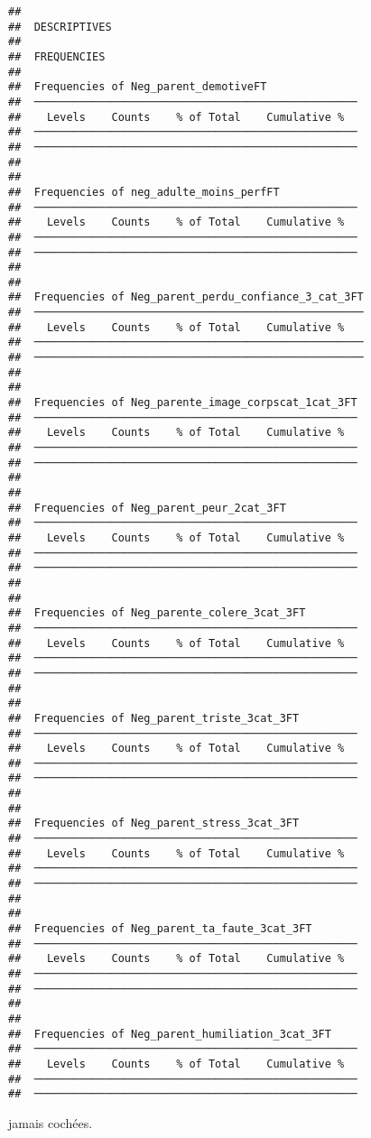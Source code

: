 \documentclass[
]{article}
\begin{document}
\begin{verbatim}
## 
##  DESCRIPTIVES
## 
##  FREQUENCIES
## 
##  Frequencies of Neg_parent_demotiveFT               
##  ────────────────────────────────────────────────── 
##    Levels    Counts    % of Total    Cumulative %   
##  ────────────────────────────────────────────────── 
##  ────────────────────────────────────────────────── 
## 
## 
##  Frequencies of neg_adulte_moins_perfFT             
##  ────────────────────────────────────────────────── 
##    Levels    Counts    % of Total    Cumulative %   
##  ────────────────────────────────────────────────── 
##  ────────────────────────────────────────────────── 
## 
## 
##  Frequencies of Neg_parent_perdu_confiance_3_cat_3FT 
##  ─────────────────────────────────────────────────── 
##    Levels    Counts    % of Total    Cumulative %   
##  ─────────────────────────────────────────────────── 
##  ─────────────────────────────────────────────────── 
## 
## 
##  Frequencies of Neg_parente_image_corpscat_1cat_3FT 
##  ────────────────────────────────────────────────── 
##    Levels    Counts    % of Total    Cumulative %   
##  ────────────────────────────────────────────────── 
##  ────────────────────────────────────────────────── 
## 
## 
##  Frequencies of Neg_parent_peur_2cat_3FT            
##  ────────────────────────────────────────────────── 
##    Levels    Counts    % of Total    Cumulative %   
##  ────────────────────────────────────────────────── 
##  ────────────────────────────────────────────────── 
## 
## 
##  Frequencies of Neg_parente_colere_3cat_3FT         
##  ────────────────────────────────────────────────── 
##    Levels    Counts    % of Total    Cumulative %   
##  ────────────────────────────────────────────────── 
##  ────────────────────────────────────────────────── 
## 
## 
##  Frequencies of Neg_parent_triste_3cat_3FT          
##  ────────────────────────────────────────────────── 
##    Levels    Counts    % of Total    Cumulative %   
##  ────────────────────────────────────────────────── 
##  ────────────────────────────────────────────────── 
## 
## 
##  Frequencies of Neg_parent_stress_3cat_3FT          
##  ────────────────────────────────────────────────── 
##    Levels    Counts    % of Total    Cumulative %   
##  ────────────────────────────────────────────────── 
##  ────────────────────────────────────────────────── 
## 
## 
##  Frequencies of Neg_parent_ta_faute_3cat_3FT        
##  ────────────────────────────────────────────────── 
##    Levels    Counts    % of Total    Cumulative %   
##  ────────────────────────────────────────────────── 
##  ────────────────────────────────────────────────── 
## 
## 
##  Frequencies of Neg_parent_humiliation_3cat_3FT     
##  ────────────────────────────────────────────────── 
##    Levels    Counts    % of Total    Cumulative %   
##  ────────────────────────────────────────────────── 
##  ──────────────────────────────────────────────────
\end{verbatim}

jamais cochées.
\end{document}
